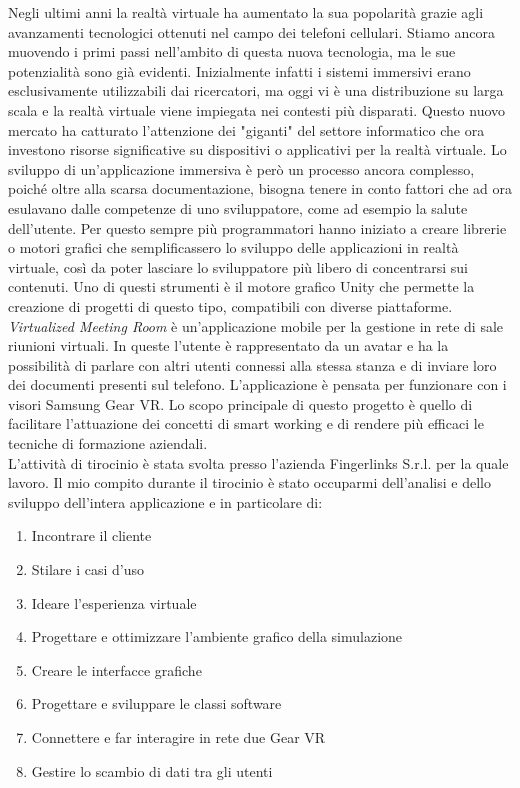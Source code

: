 Negli ultimi anni la realtà virtuale ha aumentato la sua popolarità grazie agli avanzamenti tecnologici ottenuti nel campo dei telefoni cellulari. Stiamo ancora muovendo i primi passi nell'ambito di questa nuova tecnologia, ma le sue potenzialità sono già evidenti. Inizialmente infatti i sistemi immersivi erano esclusivamente utilizzabili dai ricercatori, ma oggi vi è una distribuzione su larga scala e la realtà virtuale viene impiegata nei contesti più disparati. Questo nuovo mercato ha catturato l'attenzione dei "giganti" del settore informatico che ora investono risorse significative su dispositivi o applicativi per la realtà virtuale.
Lo sviluppo di un'applicazione immersiva è però un processo ancora complesso, poiché oltre alla scarsa documentazione, bisogna tenere in conto fattori che  ad ora esulavano dalle competenze di uno sviluppatore, come ad esempio la salute dell'utente. Per questo sempre più programmatori hanno iniziato a creare librerie o motori grafici che semplificassero lo sviluppo delle applicazioni in realtà virtuale, così da poter lasciare lo sviluppatore più libero di concentrarsi sui contenuti. Uno di questi strumenti è il motore grafico Unity che permette la creazione di progetti di questo tipo, compatibili con diverse piattaforme. \\
\textit{Virtualized Meeting Room} è un'applicazione mobile per la gestione in rete di sale riunioni virtuali. In queste l'utente è rappresentato da un avatar e ha la possibilità di parlare con altri utenti connessi alla stessa stanza e di inviare loro dei documenti presenti sul telefono. L'applicazione è pensata per funzionare con i visori Samsung Gear VR. Lo scopo principale di questo progetto è quello di facilitare l'attuazione dei concetti di smart working e di rendere più efficaci le tecniche di formazione aziendali. \\
\newpage
L'attività di tirocinio è stata svolta presso l'azienda Fingerlinks S.r.l. per la quale lavoro.
Il mio compito durante il tirocinio è stato occuparmi dell'analisi e dello sviluppo dell'intera applicazione e in particolare di:
\begin{enumerate}
	\item Incontrare il cliente
	\item Stilare i casi d'uso
	\item Ideare l'esperienza virtuale
	\item Progettare e ottimizzare l'ambiente grafico della simulazione
	\item Creare le interfacce grafiche
	\item Progettare e sviluppare le classi software
	\item Connettere e far interagire in rete due Gear VR
	\item Gestire lo scambio di dati tra gli utenti
\end{enumerate}

